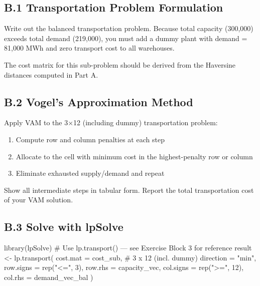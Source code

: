 \documentclass[
  a4paper,
]{article}
\newenvironment{Shaded}{\begin{snugshade}}{\end{snugshade}}
\newcommand{\AttributeTok}[1]{\textcolor[rgb]{0.40,0.45,0.13}{#1}}
\newcommand{\CommentTok}[1]{\textcolor[rgb]{0.37,0.37,0.37}{#1}}
\newcommand{\DecValTok}[1]{\textcolor[rgb]{0.68,0.00,0.00}{#1}}
\newcommand{\FunctionTok}[1]{\textcolor[rgb]{0.28,0.35,0.67}{#1}}
\newcommand{\NormalTok}[1]{\textcolor[rgb]{0.00,0.23,0.31}{#1}}
\newcommand{\OtherTok}[1]{\textcolor[rgb]{0.00,0.23,0.31}{#1}}
\newcommand{\StringTok}[1]{\textcolor[rgb]{0.13,0.47,0.30}{#1}}
\providecommand{\tightlist}{%
  \setlength{\itemsep}{0pt}\setlength{\parskip}{0pt}}
\begin{document}
\subsection{B.1 Transportation Problem
Formulation}\label{b.1-transportation-problem-formulation}

Write out the balanced transportation problem. Because total capacity
(300,000) exceeds total demand (219,000), you must add a dummy plant
with demand = 81,000 MWh and zero transport cost to all warehouses.

The cost matrix for this sub-problem should be derived from the
Haversine distances computed in Part A.

\subsection{B.2 Vogel's Approximation
Method}\label{b.2-vogels-approximation-method}

Apply VAM to the 3×12 (including dummy) transportation problem:

\begin{enumerate}
\def\labelenumi{\arabic{enumi}.}
\tightlist
\item
  Compute row and column penalties at each step
\item
  Allocate to the cell with minimum cost in the highest-penalty row or
  column
\item
  Eliminate exhausted supply/demand and repeat
\end{enumerate}

Show all intermediate steps in tabular form. Report the total
transportation cost of your VAM solution.

\subsection{B.3 Solve with lpSolve}\label{b.3-solve-with-lpsolve}

\begin{Shaded}
\begin{Highlighting}[]
\FunctionTok{library}\NormalTok{(lpSolve)}
\CommentTok{\# Use lp.transport() — see Exercise Block 3 for reference}
\NormalTok{result }\OtherTok{\textless{}{-}} \FunctionTok{lp.transport}\NormalTok{(}
  \AttributeTok{cost.mat  =}\NormalTok{ cost\_sub,       }\CommentTok{\# 3 x 12 (incl. dummy)}
  \AttributeTok{direction =} \StringTok{"min"}\NormalTok{,}
  \AttributeTok{row.signs =} \FunctionTok{rep}\NormalTok{(}\StringTok{"\textless{}="}\NormalTok{, }\DecValTok{3}\NormalTok{),}
  \AttributeTok{row.rhs   =}\NormalTok{ capacity\_vec,}
  \AttributeTok{col.signs =} \FunctionTok{rep}\NormalTok{(}\StringTok{"\textgreater{}="}\NormalTok{, }\DecValTok{12}\NormalTok{),}
  \AttributeTok{col.rhs   =}\NormalTok{ demand\_vec\_bal}
\NormalTok{)}
\end{Highlighting}
\end{Shaded}
\end{document}
